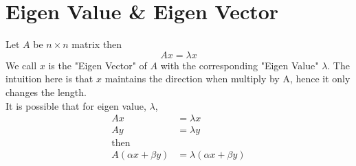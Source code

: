 \documentclass[12pt]{article}
\begin{document}
\section{Eigen Value \& Eigen Vector}

Let $A$ be $n\times n$ matrix then
\[
Ax = \lambda x
\]
We call $x$ is the "Eigen Vector" of $A$ with the corresponding "Eigen Value" $\lambda$. The intuition here is that $x$ maintains the direction when multiply by A, hence it only changes the length.
\\
It is possible that for eigen value, $\lambda$,
\begin{align*}
Ax &= \lambda x\\
Ay &= \lambda y\\
\text{then}\\
A(\alpha x+\beta y) &= \lambda (\alpha x + \beta y)
\end{align*}
\end{document}

